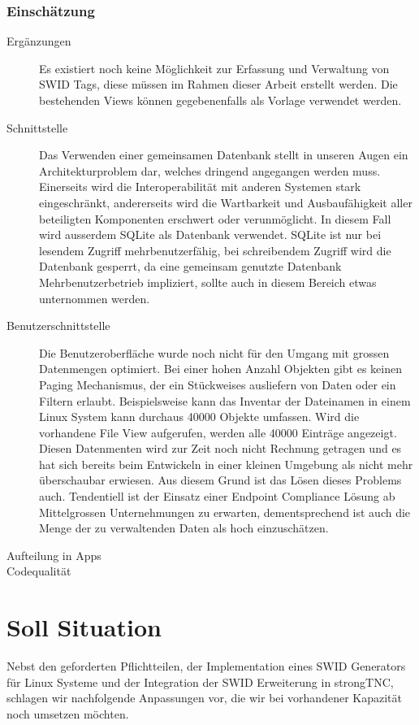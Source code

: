 \subsubsection{Einschätzung}
\begin{description}
	\item[Ergänzungen] Es existiert noch keine Möglichkeit zur Erfassung und
	Verwaltung von SWID Tags, diese müssen im Rahmen dieser Arbeit erstellt werden.
	Die bestehenden Views können gegebenenfalls als Vorlage verwendet werden.
	
	\item[Schnittstelle] Das Verwenden einer gemeinsamen Datenbank stellt in unseren
	Augen ein Architekturproblem dar, welches dringend angegangen werden muss.
	Einerseits wird die Interoperabilität mit anderen Systemen stark eingeschränkt,
	andererseits wird die Wartbarkeit und Ausbaufähigkeit aller beteiligten
	Komponenten erschwert oder verunmöglicht. In diesem Fall wird ausserdem SQLite
	als Datenbank verwendet. SQLite ist nur bei lesendem Zugriff mehrbenutzerfähig,
	bei schreibendem Zugriff wird die Datenbank gesperrt, da eine gemeinsam
	genutzte Datenbank Mehrbenutzerbetrieb impliziert, sollte auch in diesem Bereich
	etwas unternommen werden. 
	
	\item[Benutzerschnittstelle] 
	Die Benutzeroberfläche wurde noch nicht für den Umgang mit grossen Datenmengen
	optimiert. Bei einer hohen Anzahl Objekten gibt es keinen Paging Mechanismus,
	der ein Stückweises ausliefern von Daten oder ein Filtern erlaubt.
	Beispielsweise kann das Inventar der Dateinamen in einem Linux System kann
	durchaus 40000 Objekte umfassen. Wird die vorhandene File View aufgerufen,
	werden alle 40000 Einträge angezeigt.\\
	Diesen Datenmenten wird zur Zeit noch nicht Rechnung getragen und es hat sich
	bereits beim Entwickeln in einer kleinen Umgebung als nicht mehr überschaubar
	erwiesen. Aus diesem Grund ist das Lösen dieses Problems auch. Tendentiell ist
	der Einsatz einer Endpoint Compliance Lösung ab Mittelgrossen Unternehmungen zu
	erwarten, dementsprechend ist auch die Menge der zu verwaltenden Daten als hoch
	einzuschätzen.

\item[Aufteilung in Apps] 
	
\item[Codequalität]
	
	
\end{description}

\section{Soll Situation}
Nebst den geforderten Pflichtteilen, der Implementation eines SWID Generators
für Linux Systeme und der Integration der SWID Erweiterung in strongTNC,
schlagen wir nachfolgende Anpassungen vor, die wir bei vorhandener Kapazität
noch umsetzen möchten.

